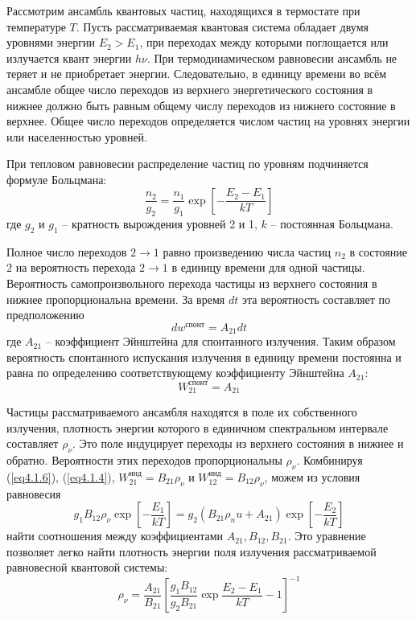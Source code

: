 
Рассмотрим ансамбль квантовых частиц, находящихся в термостате при 
температуре \( T \). Пусть рассматриваемая квантовая система обладает двумя 
уровнями энергии \( E_2 > E_1 \), при переходах между которыми поглощается 
или излучается квант энергии \( h\nu \). При термодинамическом равновесии 
ансамбль не теряет и не приобретает энергии. Следовательно, в единицу времени 
во всём ансамбле общее число переходов из верхнего энергетического состояния 
в нижнее должно быть равным общему числу переходов из нижнего состояние в 
верхнее. Общее число переходов определяется числом частиц на уровнях энергии 
или населенностью уровней. 

При тепловом равновесии распределение частиц по уровням подчиняется формуле 
Больцмана:
\begin{equation}
	\frac{n_2}{g_2} = \frac{n_1}{g_1}\exp
		\left[ -\frac{E_2 - E_1}{kT}\right]
	\label{eq4.1.4}
\end{equation}
где \( g_2 \) и \( g_1 \) -- кратность вырождения уровней 2 и 1, 
\( k \) -- постоянная Больцмана.

Полное число переходов \( 2 \rightarrow 1 \) равно произведению числа частиц 
\( n_2 \) в состояние \( 2 \) на вероятность перехода \( 2 \rightarrow 1 \) 
в единицу времени для одной частицы. Вероятность самопроизвольного перехода 
частицы из верхнего состояния в нижнее пропорциональна времени. За время 
\( dt \) эта вероятность составляет по предположению
\[
	dw^\text{спонт} = A_{21} dt
\]
где \( A_{21} \) -- коэффициент Эйнштейна для спонтанного излучения. Таким 
образом вероятность спонтанного испускания излучения в единицу времени 
постоянна и равна по определению соответствующему коэффициенту Эйнштейна 
\( A_{21} \):
\begin{equation}
	W_{21}^\text{спонт} = A_{21}
	\label{eq4.1.6}
\end{equation}

Частицы рассматриваемого ансамбля находятся в поле их собственного излучения, 
плотность энергии которого в единичном спектральном интервале составляет 
\( \rho_\nu \). Это поле индуцирует переходы из верхнего состояния в нижнее 
и обратно. Вероятности этих переходов пропорциональны \( \rho_\nu \). 
Комбинируя (\ref{eq4.1.6}), (\ref{eq4.1.4}), 
\( W_{21}^\text{инд} = B_{21}\rho_\nu \) и 
\( W_{12}^\text{инд} = B_{12}\rho_\nu \), можем из условия равновесия
\[
	g_1 B_{12} \rho_\nu \exp\left[ -\frac{E_1}{kT} \right] = 
	g_2 \left( B_{21}\rho_nu + A_{21} \right)
		\exp\left[ -\frac{E_2}{kT} \right]
\]
найти соотношения между коэффициентами \( A_{21}, B_{12}, B_{21} \). Это 
уравнение позволяет легко найти плотность энергии поля излучения 
рассматриваемой равновесной квантовой системы:
\[
	\rho_\nu = \frac{A_{21}}{B_{21}}
		\left[ 
			\frac{g_1 B_{12}}{g_2 B_{21}}\exp\frac{E_2 - E_1}{kT} - 1 
		\right]^{-1}
\]

